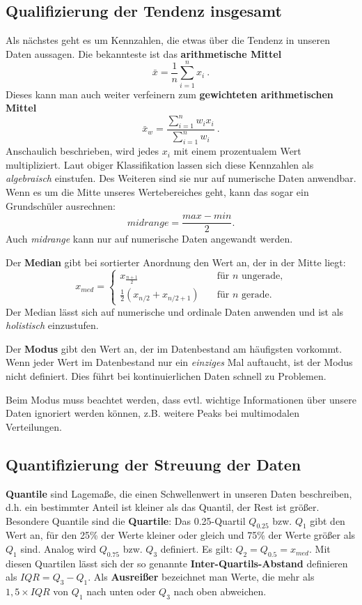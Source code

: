 \subsection{Qualifizierung der Tendenz insgesamt}
Als nächstes geht es um Kennzahlen, die etwas über die Tendenz in unseren Daten aussagen. Die bekannteste ist das \textbf{arithmetische Mittel}
\[\bar{x}= \frac{1}{n} \sum_{i=1}^n x_i\ .\]
Dieses kann man auch weiter verfeinern zum \textbf{gewichteten arithmetischen Mittel}
\[\bar{x}_w = \frac{\sum_{i=1}^n w_i x_i}{\sum_{i=1}^n w_i}\ .\]
Anschaulich beschrieben, wird jedes \(x_i\) mit einem prozentualem Wert
multipliziert.
Laut obiger Klassifikation lassen sich diese Kennzahlen als \textit{algebraisch} einstufen. Des Weiteren sind sie nur auf numerische Daten anwendbar.
Wenn es um die Mitte unseres Wertebereiches geht, kann das sogar ein Grundschüler ausrechnen:
\[midrange = \frac{max - min}{2}.\]
Auch \textit{midrange} kann nur auf numerische Daten angewandt werden.

Der \textbf{Median} gibt bei sortierter Anordnung den Wert an, der in der Mitte liegt:
\[
x_{med} = 
\begin{cases}
	x_{\frac{n+1}{2}} &\quad \text{für } n \text{ ungerade,}\\
	\frac{1}{2}(x_{n/2} + x_{n/2+1}) &\quad \text{für } n \text{ gerade.}\
\end{cases}
\]
Der Median lässt sich auf numerische und ordinale Daten anwenden und ist als \textit{holistisch} einzustufen.

Der \textbf{Modus} gibt den Wert an, der im Datenbestand am häufigsten vorkommt. Wenn jeder Wert im Datenbestand nur ein \emph{einziges} Mal auftaucht, ist der Modus nicht definiert. Dies führt bei kontinuierlichen Daten schnell zu Problemen.

\noindent Beim Modus muss beachtet werden, dass evtl. wichtige Informationen über unsere Daten ignoriert werden können, z.B. weitere Peaks bei multimodalen Verteilungen.

\subsection{Quantifizierung der Streuung der Daten}
\textbf{Quantile} sind Lagemaße, die einen Schwellenwert in unseren Daten
beschreiben, d.h. ein bestimmter Anteil ist kleiner als das Quantil, der Rest
ist größer. Besondere Quantile sind die \textbf{Quartile}: Das 0.25-Quartil
\(Q_{0.25}\) bzw. \(Q_1\) gibt den Wert an, für den 25\% der Werte kleiner oder
gleich und 75\% der Werte größer als \(Q_1\) sind. Analog wird
\(Q_{0.75}\) bzw. \(Q_3\) definiert. Es gilt: \(Q_2 = Q_{0.5} = x_{med}\). Mit
diesen Quartilen lässt sich der so genannte \textbf{Inter-Quartils-Abstand}
definieren als \(IQR = Q_3 - Q_1\). Als \textbf{Ausreißer} bezeichnet man
Werte, die mehr als \(1,5 \times IQR\) von \(Q_1\) nach unten oder \(Q_3\)
nach oben abweichen.

